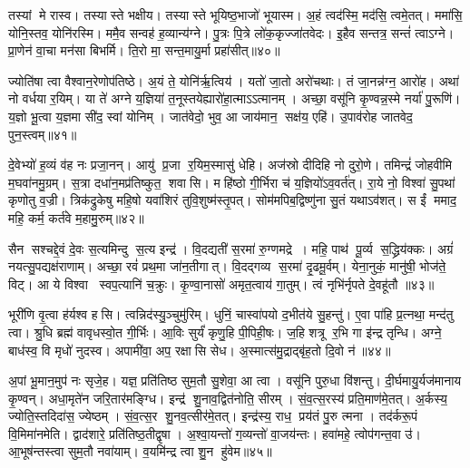 तस्यां मे रास्व।
तस्यास्ते भक्षीय।
तस्यास्ते भूयिष्ठ॒भाजो॑ भूयास्म।
अ॒हं त्वद॑स्मि॒ मद॑सि॒ त्वमे॒तत्।
ममा॑सि॒ योनि॒स्तव॒ योनि॑रस्मि।
ममै॒व सन्वह॑ ह॒व्यान्य॑ग्ने।
पु॒त्रः पि॒त्रे लो॑क॒कृज्जा॑तवेदः।
इ॒हैव सन्तत्र॒ सन्तं॑ त्वाऽग्ने।
प्रा॒णेन॑ वा॒चा मन॑सा बिभर्मि।
ति॒रो मा॒ सन्त॒मायु॒र्मा प्रहा॑सीत्॥४०॥

ज्योति॑षा त्वा वैश्वान॒रेणोप॑तिष्ठे।
अ॒यं ते॒ योनि॑र्\mbox{}ऋ॒त्विय॑।
यतो॑ जा॒तो अरो॑चथाः।
तं जा॒नन्न॑ग्न॒ आरो॑ह।
अथा॑ नो वर्धया र॒यिम्।
या ते॑ अग्ने य॒ज्ञिया॑ त॒नूस्तयेह्यारो॑हा॒त्माऽऽत्मानम्।
अच्छा॒ वसू॑नि कृ॒ण्वन्न॒स्मे नर्या॑ पु॒रूणि॑।
य॒ज्ञो भू॒त्वा य॒ज्ञमा सी॑द॒ स्वां योनिम्।
जात॑वेदो॒ भुव॒ आ जाय॑मान॒ सक्ष॑य॒ एहि॑।
उ॒पाव॑रोह जातवेद॒ पुन॒स्त्वम्॥४१॥

दे॒वेभ्यो॑ ह॒व्यं व॑ह नः प्रजा॒नन्।
आयु॑ प्र॒जा र॒यिम॒स्मासु॑ धेहि।
अज॑स्रो दीदिहि नो दुरो॒णे।
तमिन्द्रं॑ जोहवीमि म॒घवा॑नमु॒ग्रम्।
स॒त्रा दधा॑न॒मप्र॑तिष्कुत॒ शवासि।
महि॑ष्ठो गी॒र्भिरा च॑ य॒ज्ञियो॑ऽव॒वर्त॑त्।
रा॒ये नो॒ विश्वा॑ सु॒पथा॑ कृणोतु व॒ज्री।
त्रिक॑द्रुकेषु महि॒षो यवा॑शिरं तुवि॒शुष्म॑स्तृ॒पत्।
सोम॑मपिब॒द्विष्णु॑ना सु॒तं यथाऽव॑शत्।
स ईं ममाद॒ महि॒ कर्म॒ कर्त॑वे म॒हामु॒रुम्॥४२॥

सैन सश्चद्दे॒वं दे॒वः स॒त्यमिन्दु स॒त्य इन्द्र॑।
वि॒दद्यती॑ स॒रमा॑ रु॒ग्णमद्रे।
महि॒ पाथ॑ पू॒र्व्य स॒द्ध्रिय॑क्कः।
अग्रं॑ नयत्सु॒पद्यक्ष॑राणाम्।
अच्छा॒ रवं॑ प्रथ॒मा जा॑न॒तीगात्।
वि॒दद्गव्य स॒रमा॑ दृ॒ढमू॒र्वम्।
येना॒नुकं॒ मानु॑षी॒ भोज॑ते॒ विट्।
आ ये विश्वा स्वप॒त्यानि॑ च॒क्रुः।
कृ॒ण्वा॒नासो॑ अमृत॒त्वाय॑ गा॒तुम्।
त्वं नृभि॑र्नृपते दे॒वहू॑तौ ॥४३॥

भूरी॑णि वृ॒त्वा ह॑र्यश्व हसि।
त्वन्निद॑स्यु॒ञ्चुमु॑रिम्।
धुनिं॒ चास्वा॑पयो द॒भीत॑ये सु॒हन्तु॑।
ए॒वा पा॑हि प्र॒त्नथा॒ मन्द॑तु त्वा।
श्रु॒धि ब्रह्म॑ वावृधस्वो॒त गी॒र्भिः।
आ॒विः सुर्यं॑ कृणु॒हि पी॒पिही॒षः।
ज॒हि शत्रू र॒भि गा इ॑न्द्र तृन्धि।
अग्ने॒ बाध॑स्व॒ वि मृधो॑ नुदस्व।
अपामी॑वा॒ अप॒ रक्षासि सेध।
अ॒स्मात्स॑मु॒द्राद्बृ॑ह॒तो दि॒वो न॑॥४४॥

अ॒पां भू॒मान॒मुप॑ नः सृजे॒ह।
यज्ञ॒ प्रति॑तिष्ठ सुम॒तौ सु॒शेवा॒ आ त्वा।
वसू॑नि पुरु॒धा वि॑शन्तु।
दी॒र्घमायु॒र्यज॑मानाय कृ॒ण्वन्।
अधा॒मृते॑न जरि॒तार॑मङ्ग्धि।
इन्द्र॑ शु॒नाव॒द्वित॑नोति॒ सीरम्।
सं॒व॒त्स॒रस्य॑ प्रति॒माण॑मे॒तत्।
अ॒र्कस्य॒ ज्योति॒स्तदिदा॑स॒ ज्येष्ठम्।
सं॒व॒त्स॒र शु॒नव॒त्सीर॑मे॒तत्।
इन्द्र॑स्य॒ राध॒ प्रय॑तं पु॒रु त्मना।
तद॑र्करू॒पं वि॒मिमा॑नमेति।
द्वाद॑शारे॒ प्रति॑तिष्ठ॒तीद्वृषा।
अ॒श्वा॒यन्तो॑ ग॒व्यन्तो॑ वा॒जय॑न्तः।
हवा॑महे॒ त्वोप॑गन्त॒वा उ॑।
आ॒भूष॑न्तस्त्वा सुम॒तौ नवा॑याम्।
व॒यमि॑न्द्र त्वा शु॒न हु॑वेम॥४५॥\anuvakamend[अ॒र्च॒त॒ ह॒विर्गा॑यत यसच्चर्\mbox{}षणी॒नां वै॑शम्भ॒ल्या हा॑सी॒त्त्वमु॒रुं दे॒वहू॑तौ न॒स्त्मना॒ षट्च॑]




